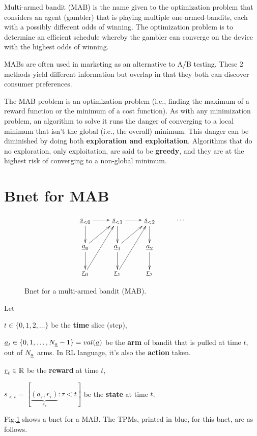 Multi-armed bandit (MAB)
is the name given to the 
optimization problem that considers an agent (gambler)
that
is playing multiple one-armed-bandits,
each with a possibly
different odds of winning.
The optimization problem is to determine
an efficient schedule
whereby the gambler can converge 
on the device with the highest odds of winning.




MABs are often used in marketing 
as an alternative to A/B testing.
These 2 methods yield different 
information but
overlap in that they 
both can discover consumer preferences.

The MAB problem is
an optimization problem (i.e., 
finding the maximum of 
a reward  function
or the minimum of a cost function).
As with any minimization problem,
an algorithm to solve it
runs the danger of
converging
to a local minimum
that isn't the global (i.e., 
the overall) minimum.
This danger can be diminished 
by doing both {\bf exploration
and exploitation}.
Algorithms that do no exploration,
only exploitation,
are said to be {\bf greedy},
and they are at the highest 
risk of converging to a non-global minimum.


\section{Bnet for MAB}
\begin{figure}[h!]
\centering
$$\xymatrix{
\rvs_{<0}\ar[r]\ar[d]&
\rvs_{<1}\ar[r]\ar[d]&
\rvs_{<2}\ar[d]&\cdots\\
\rva_0\ar[ur]\ar[d]&
\rva_1\ar[ur]\ar[d]&
\rva_2\ar[d]
\\
\rvr_0\ar[uur]&
\rvr_1\ar[uur]&
\rvr_2
}$$
\caption{Bnet for a multi-armed bandit (MAB).}
\label{fig-mab-bnet}
\end{figure}

Let 

$t\in \{0,1, 2, \ldots\}$ be the {\bf time}
 slice (step),

$\rva_t\in \{0, 1, \ldots, N_\rva-1\}=val(\rva)$
 be the {\bf arm} of bandit
that is pulled at time $t$, out of $N_\rva$ arms.
In RL language, it's also the {\bf action} taken.

$\rvr_t\in \RR$ be the {\bf reward} at time $t$,


$s_{<t} = [\underbrace{
(a_\tau, r_\tau)}_{s_\tau}: \tau<t]$
be the {\bf state} at time $t$.

Fig.\ref{fig-mab-bnet}
shows a bnet 
for a MAB.
The TPMs, printed in blue,
for this bnet, are as follows.


